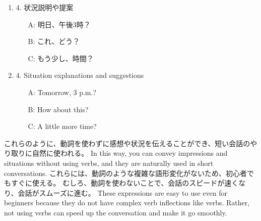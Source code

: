 \documentclass[uplatex,dvipdfmx,b5paper,english,10pt]{jsbook}
\begin{document}
\begin{enumerate}
  \ifJapanese
  \item 4. 状況説明や提案
    \begin{itemize}
      \item[A:] 明日、午後3時？
      \item[B:] これ、どう？
      \item[C:] もう少し、時間？
    \end{itemize}
 \else
  \item 4. Situation explanations and suggestions
    \begin{itemize}
      \item[A:] Tomorrow, 3 p.m.?
      \item[B:] How about this?
      \item[C:] A little more time?
    \end{itemize}
  \fi
\end{enumerate}

\ifJapanese
これらのように、動詞を使わずに感想や状況を伝えることができ、短い会話のやり取りに自然に使われる。
\else
In this way, you can convey impressions and situations without using verbs, and they are naturally used in short conversations.
\fi
\ifJapanese
  これらには、動詞のような複雑な語形変化がないため、初心者でもすぐに使える。
  むしろ、動詞を使わないことで、会話のスピードが速くなり、会話がスムーズに進む。
\else
  These expressions are easy to use even for beginners because they do not have complex verb inflections like verbs.
  Rather, not using verbs can speed up the conversation and make it go smoothly.
\fi
\end{document}

